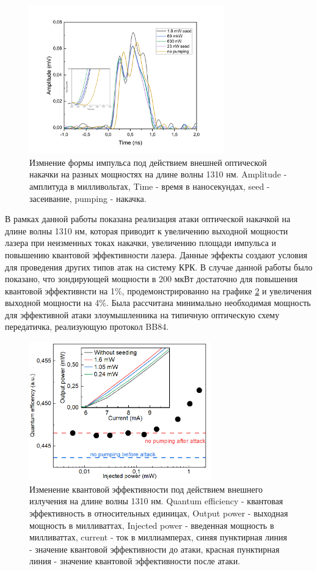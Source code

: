 \begin{figure}
    \centering
    \includegraphics[width=0.75\textwidth]{images/Импульсы под действием 1310 для диссера.png}
    \caption{Измнение формы импульса под действием внешней оптической накачки на разных мощностях на длине волны 1310 нм. Amplitude - амплитуда в милливольтах, Time - время в наносекундах, seed - засеивание, pumping - накачка.}
    \label{fig:pulses 1310 ref}
\end{figure}
\newpage В рамках данной работы показана реализация атаки оптической накачкой на длине волны 1310 нм, которая приводит к увеличению выходной мощности лазера при неизменных токах накачки, увеличению площади импульса и повышению квантовой эффективности лазера. Данные эффекты создают условия для проведения других типов атак на систему КРК. В случае данной работы было показано, что зондирующей мощности в 200 мкВт достаточно для повышения квантовой эффективнсти на 1\%, продемонстрированно на графике \ref{fig:eff ref} и увеличения выходной мощности на 4\%. Была рассчитана минимально необходимая мощность для эффективной атаки злоумышленника на типичную оптическую схему передатичка, реализующую протокол BB84.
\begin{figure}
    \centering
    \includegraphics[width=0.7\textwidth]{images/Эффективность 1310.png}
    \caption{Изменение квантовой эффективности под действием внешнего излучения на длине волны 1310 нм. Quantum efficiency - квантовая эффективность в относительных единицах, Output power - выходная мощность в милливаттах, Injected power - введенная мощность в милливаттах, current - ток в миллиамперах, синяя  пунктирная линия - значение квантовой эффективности до атаки, красная пунктирная линия - значение квантовой эффективности после атаки. }
    \label{fig:eff ref}
\end{figure}

